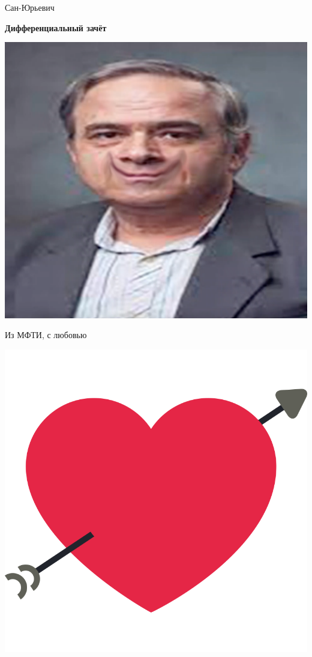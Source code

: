 \documentclass[12pt]{article}
\begin{document}
                                          
\begin{titlepage}                                         
	\begin{center}                                          
		\Huge                                                 
		Сан-Юрьевич                                            
		\vspace*{1cm}                                         
                                                           
		\textbf{Дифференциальный зачёт}                       
                                                           
		\vspace{0.5cm}                                        
		\vspace{1.5cm}                                        
		\includegraphics[width = 10 cm]{imgs/petrovich.png}   
		\begin{minipage}{10cm}                                
		\vspace*{2cm}                                         
			\begin{center}                                      
				Из МФТИ, с любовью                                 
			\end{center}                                        
		\includegraphics[width = 3 cm]{imgs/with_love.png}    
		\end{minipage}                                        
                                                           
	\end{center}                                            
\end{titlepage}                                           
\end{document}
